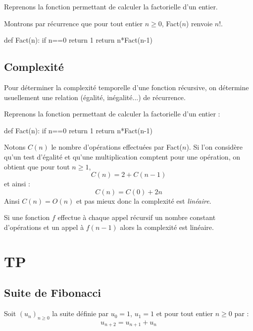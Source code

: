 \documentclass[french,11pt,twoside]{VcCours}
\begin{document}
\begin{Exercice}{} Reprenons la fonction permettant de calculer la factorielle d'un entier.

    Montrons par récurrence que pour tout entier $n \geq 0$, Fact($n$) renvoie $n!$.
\end{Exercice}

\begin{Python}
def Fact(n):
    if n==0
        return 1
    return n*Fact(n-1)
\end{Python} 

\vspace{8cm}

\subsection{Complexité}
Pour déterminer la complexité temporelle d'une fonction récursive, on détermine usuellement une relation (égalité, inégalité...) de récurrence.

\begin{Exercice}{} Reprenons la fonction permettant de calculer la factorielle d'un entier :
\end{Exercice}

\begin{Python}
def Fact(n):
    if n==0
        return 1
    return n*Fact(n-1)
\end{Python} 

Notons $C(n)$ le nombre d'opérations effectuées par Fact($n$). Si l'on considère qu'un test d'égalité et qu'une multiplication comptent pour une opération, on obtient que pour tout $n \geq 1$,
$$ C(n) = 2+C(n-1)$$
et ainsi :
$$ C(n)= C(0)+2n$$
Ainsi $C(n)=O(n)$ et pas mieux donc la complexité est \emph{linéaire}.


\begin{Remarque}{} Si une fonction $f$ effectue à chaque appel récursif un nombre constant d'opérations et un appel à $f(n-1)$ alors la complexité est linéaire.
\end{Remarque}

\newpage
\section{TP}
\subsection{Suite de Fibonacci}
Soit $(u_n)_{n\geq 0}$ la suite définie par $u_0=1$, $u_1=1$ et pour tout entier $n \geq 0$ par :
$$ u_{n+2}=u_{n+1}+u_n$$
\end{document}
